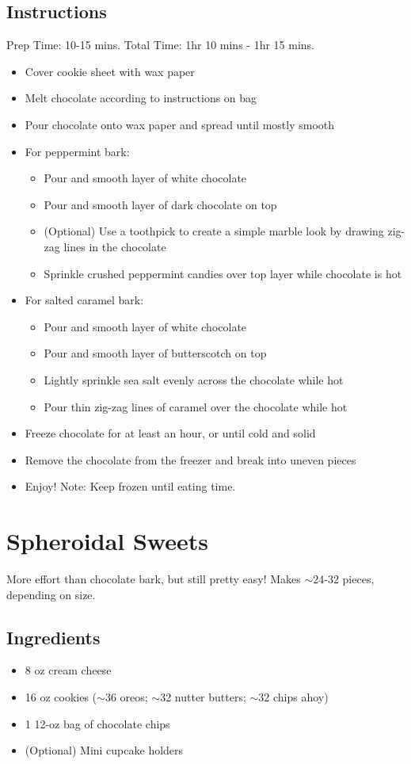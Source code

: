 \documentclass{article}
\begin{document}
\subsection{Instructions}
Prep Time: 10-15 mins. Total Time: 1hr 10 mins - 1hr 15 mins.
\begin{itemize}
\item Cover cookie sheet with wax paper
\item Melt chocolate according to instructions on bag
\item Pour chocolate onto wax paper and spread until mostly smooth
\item For peppermint bark:
\begin{itemize}
\item Pour and smooth layer of white chocolate
\item Pour and smooth layer of dark chocolate on top
\item (Optional) Use a toothpick to create a simple marble look by drawing zig-zag lines in the chocolate
\item Sprinkle crushed peppermint candies over top layer while chocolate is hot
\end{itemize}
\item For salted caramel bark:
\begin{itemize}
\item Pour and smooth layer of white chocolate
\item Pour and smooth layer of butterscotch on top
\item Lightly sprinkle sea salt evenly across the chocolate while hot
\item Pour thin zig-zag lines of caramel over the chocolate while hot
\end{itemize}
\item Freeze chocolate for at least an hour, or until cold and solid
\item Remove the chocolate from the freezer and break into uneven pieces
\item Enjoy! Note: Keep frozen until eating time.
\end{itemize}

\section{Spheroidal Sweets}
More effort than chocolate bark, but still pretty easy! Makes $\sim$24-32 pieces, depending on size.
\subsection{Ingredients}
\begin{itemize}
\item 8 oz cream cheese
\item 16 oz cookies ($\sim$36 oreos; $\sim$32 nutter butters; $\sim$32 chips ahoy)
\item 1 12-oz bag of chocolate chips
\item (Optional) Mini cupcake holders
\end{itemize}
\end{document}
